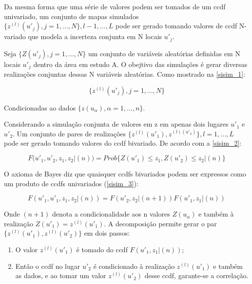 Da mesma forma que uma série de valores podem ser tomados de um ccdf univariado, um conjunto de mapas simulados $\{z^{(l)}(u'_{j}), j=1,...,N\}, l-1,...,L$ pode ser gerado tomando valores de ccdf N-variado que modela a incerteza conjunta em N locais $u'_{j}$.

Seja  $\{Z(u'_{j}), j=1,...,N\}$ um conjunto de variáveis aleatórias definidas em N locais $u'_{j}$
dentro da área em estudo A. O obejtivo das simulações é gerar diversas realizações conjuntas dessas N variáveis aleatórias. Como mostrado na \autoref{sisim_1}:

\begin{equation}
	\{z^{(l)}(u'_{j}), j=1,...,N\}
	\label{sisim_1}
\end{equation}

Condicionadas ao dados $\{z(u_{\alpha}), \alpha=1,...,n\}$.
 
Considerando a simulação conjunta de valores em z em apenas dois lugares $u'_{1}$ e  $u'_{2}$. Um conjunto de pares de realizações $\{z^{(l)}(u'_{1}), z^{(l)(u'_{2})}\},l=1,...,L$ pode ser gerado tomando valores do ccdf bivariado. De acordo com a \autoref{sisim_2}:
 	
\begin{equation}
	F(u'_{1}, u'_{2}, z_{1}, z_{2}|(n)) = Prob\{Z(u'_{1})\leq z_{1}, Z(u'_{2})\leq z_{2}|(n)\}
	\label{sisim_2}
\end{equation}
 	
O axioma de Bayes diz que quaisquer ccdfs bivariados podem ser expressos como um produto de ccdfs univariados (\autoref{sisim_3}): 

\begin{equation}
	F(u'_{1}, u'_{1}, z_{1}, z_{2}|(n)) = F(u'_{2}, z_{2}|(n+1))F(u'_{1}, z_{1}|(n))
	\label{sisim_3}
\end{equation}

Onde $(n+1)$ denota a condicionalidade aos n valores $Z(u_{\alpha})$ e também à realização $Z(u'_{1})=z^{(l)}(u'_{1})$. A decomposição permite gerar o par $\{z^{(l)}(u'_{1}), z^{(l)}(u'_{2})\}$ em dois passos:
  
\begin{enumerate}
 	\item O valor $z^{(l)}(u'_{1})$ é tomado do ccdf $F(u'_{1}, z_{1}|(n))$;
 	\item Então o ccdf no lugar $u'_{2}$ é condicionado à realização $z^{(l)}(u'_{1})$ e também as dados, e ao tomar um valor $z^{(l)}(u'_{2})$ desse ccdf, garante-se a correlação.
\end{enumerate}

